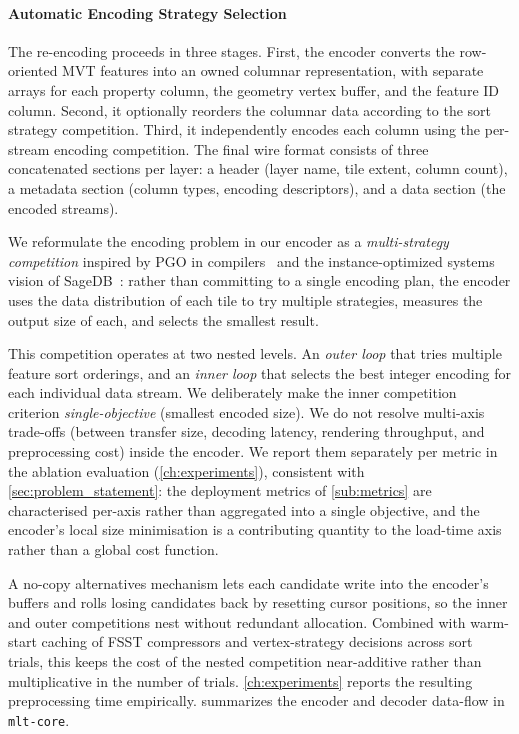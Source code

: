 {\paragraph{Automatic Encoding Strategy Selection}\label{sub:encoding_strategies}
The re-encoding proceeds in three stages.
First, the encoder converts the row-oriented \ac{MVT} features into an owned columnar representation, with separate arrays for each property column, the geometry vertex buffer, and the feature ID column.
Second, it optionally reorders the columnar data according to the sort strategy competition.
Third, it independently encodes each column using the per-stream encoding competition.
The final wire format consists of three concatenated sections per layer: a header (layer name, tile extent, column count), a metadata section (column types, encoding descriptors), and a data section (the encoded streams).

We reformulate the encoding problem in our encoder as a \emph{multi-strategy competition} inspired by \ac{PGO} in compilers~\cite{changUsingProfileInformation1991} and the instance-optimized systems vision of SageDB~\cite{dingSageDBInstanceOptimizedData2022}:
rather than committing to a single encoding plan, the encoder uses the data distribution of each tile to try multiple strategies, measures the output size of each, and selects the smallest result.

This competition operates at two nested levels.
An \emph{outer loop} that tries multiple feature sort orderings, and an \emph{inner loop} that selects the best integer encoding for each individual data stream.
We deliberately make the inner competition criterion \emph{single-objective} (smallest encoded size).
We do not resolve multi-axis trade-offs (between transfer size, decoding latency, rendering throughput, and preprocessing cost) inside the encoder.
We report them separately per metric in the ablation evaluation (\cref{ch:experiments}), consistent with \cref{sec:problem_statement}: the deployment metrics of \cref{sub:metrics} are characterised per-axis rather than aggregated into a single objective, and the encoder's local size minimisation is a contributing quantity to the load-time axis rather than a global cost function.

A no-copy alternatives mechanism lets each candidate write into the encoder's buffers and rolls losing candidates back by resetting cursor positions, so the inner and outer competitions nest without redundant allocation.
Combined with warm-start caching of \ac{FSST} compressors and vertex-strategy decisions across sort trials, this keeps the cost of the nested competition near-additive rather than multiplicative in the number of trials. \cref{ch:experiments} reports the resulting preprocessing time empirically.
 summarizes the encoder and decoder data-flow in \texttt{mlt-core}.

}
